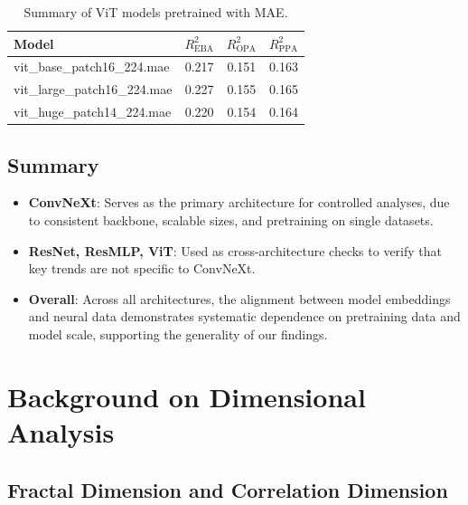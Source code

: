 \documentclass{article}
\theoremstyle{plain}
\theoremstyle{definition}
\theoremstyle{remark}
\begin{document}
\begin{table}[!t]
\caption{Summary of ViT models pretrained with MAE.}
\label{tab:vit-summary}
\centering
\small
\setlength{\tabcolsep}{6pt}
\renewcommand{\arraystretch}{1.15}
\begin{tabular}{lccc}
\toprule
Model & $R^2_{\text{EBA}}$ & $R^2_{\text{OPA}}$ & $R^2_{\text{PPA}}$ \\
\midrule
vit\_base\_patch16\_224.mae   & 0.217 & 0.151 & 0.163 \\
vit\_large\_patch16\_224.mae  & 0.227 & 0.155 & 0.165 \\
vit\_huge\_patch14\_224.mae   & 0.220 & 0.154 & 0.164 \\
\bottomrule
\end{tabular}
\end{table}


\subsection{Summary}
\label{supple:summary_models}

\begin{itemize}
    \item \textbf{ConvNeXt}: Serves as the primary architecture for controlled analyses, due to consistent backbone, scalable sizes, and pretraining on single datasets. 
    \item \textbf{ResNet, ResMLP, ViT}: Used as cross-architecture checks to verify that key trends are not specific to ConvNeXt.
    \item \textbf{Overall}: Across all architectures, the alignment between model embeddings and neural data demonstrates systematic dependence on pretraining data and model scale, supporting the generality of our findings.
\end{itemize}










\section{Background on Dimensional Analysis}
\label{supple: details of dimension}

\subsection{Fractal Dimension and Correlation Dimension}
\end{document}

